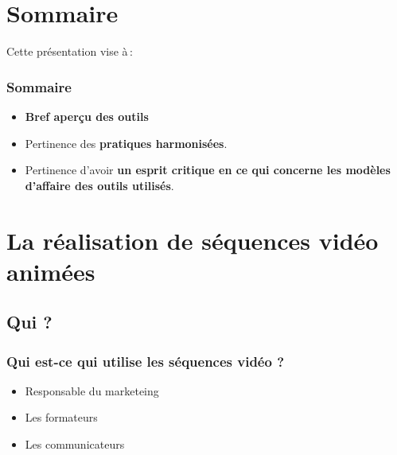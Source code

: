 	\section{Sommaire} 
		\begin{frame}
			Cette présentation vise à\,:
			\frametitle{Sommaire}
			\begin {itemize}
				\item \textbf{Bref aperçu des outils} 
				\item Pertinence des \textbf{pratiques harmonisées}.
				\item Pertinence d'avoir \textbf{un esprit critique en ce qui concerne les modèles d'affaire des outils utilisés}.

			\end{itemize}
		\end{frame}

\section{La réalisation de séquences vidéo animées} 
		
	
\subsection{Qui ?} 
		\begin{frame}[allowframebreaks]
			\frametitle{Qui est-ce qui utilise les séquences vidéo ?}
			\begin {itemize}
				\item Responsable du marketeing
				\item Les formateurs
				\item Les communicateurs

			\end{itemize}
		\end{frame}

